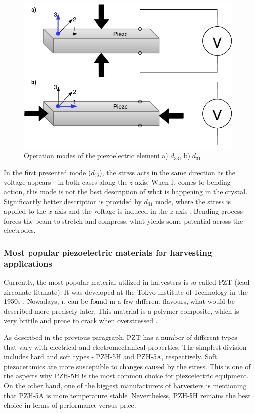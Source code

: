 \documentclass[12pt,a4paper]{article}
\begin{document}
\begin{figure}[ht!]
\includegraphics[scale=1]{piezo_operation_modes.pdf}
\caption{Operation modes of the piezoelectric element a)  $d_{33}$, b) $d_{31}$}
\label{fig:piezo_modes}
\end{figure}

In the first presented mode ($d_{33}$), the stress acts in the same direction as the voltage appears - in both cases along the $z$ axis. When it comes to bending action, this mode is not the best description of what is happening in the crystal. Significantly better description is provided by $d_{31}$ mode, where the stress is applied to the $x$ axis and the voltage is induced in the $z$ axis \cite{cmos}. Bending process forces the beam to stretch and compress, what yields some potential across the electrodes. 
\subsubsection{Most popular piezoelectric materials for harvesting applications}
Currently, the most popular material utilized in harvesters is so called PZT (lead zirconate titanate). It was developed at the Tokyo Institute of Technology in the 1950s \cite{EnHv2}. Nowadays, it can be found in a few different flavours, what would be described more precisely later. This material is a polymer composite, which is very brittle and prone to crack when overstressed \cite{cmos}.
\par

As described in the previous paragraph, PZT has a number of different types that vary with electrical and electromechanical properties. The simplest division includes hard and soft types - PZH-5H and PZH-5A, respectively. Soft piezoceramics are more susceptible to changes caused by the stress. This is one of the aspects why PZH-5H is the most common choice for piezoelectric equipment. On the other hand, one of the biggest manufacturers of harvesters \cite{PPA} is mentioning that PZH-5A is more temperature stable. Nevertheless, PZH-5H remains the best choice in terms of performance versus price. 
\par
\end{document}
